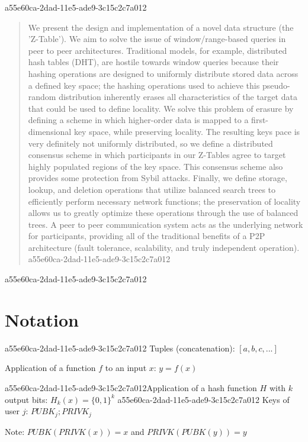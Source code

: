 \documentclass[12pt]{article}
\begin{document}
a55e60ca-2dad-11e5-ade9-3c15c2c7a012\maketitle

\begin{abstract}
We present the design and implementation of a novel data structure (the 'Z-Table'). We aim to solve the issue of window/range-based queries in peer to peer architectures. Traditional models, for example,  distributed hash tables (DHT), are hostile towards window queries because their hashing operations are designed to uniformly distribute stored data across a defined key space; the hashing operations used to achieve this pseudo-random distribution inherently erases all characteristics of the target data that could be used to define locality. We solve this problem of erasure by defining a scheme in which higher-order data is mapped to a first-dimensional key space, while preserving locality. The resulting keys pace is very definitely not uniformly distributed, so we define a distributed consensus scheme in which participants in our Z-Tables agree to target highly populated regions of the key space. This consensus scheme also provides some protection from Sybil attacks. Finally, we define storage, lookup, and deletion operations that utilize balanced search trees to efficiently perform necessary network functions; the preservation of locality allows us to greatly optimize these operations through the use of balanced trees. A peer to peer communication system acts as the underlying network for participants, providing all of the traditional benefits of a P2P architecture (fault tolerance, scalability, and truly independent operation).
a55e60ca-2dad-11e5-ade9-3c15c2c7a012\end{abstract}
a55e60ca-2dad-11e5-ade9-3c15c2c7a012
\section{Notation}
a55e60ca-2dad-11e5-ade9-3c15c2c7a012
Tuples (concatenation): $[a,b,c,...]$

Application of a function $f$ to an input $x$: $y=f(x)$

a55e60ca-2dad-11e5-ade9-3c15c2c7a012Application of a hash function $H$ with $k$ output bits: $H_{k}(x) = \{0,1\}^k$
a55e60ca-2dad-11e5-ade9-3c15c2c7a012
Keys of user $j$: $ PUBK_j; PRIVK_j $

Note: $PUBK(PRIVK(x)) = x$ and $PRIVK(PUBK(y)) = y$~
\end{document}

